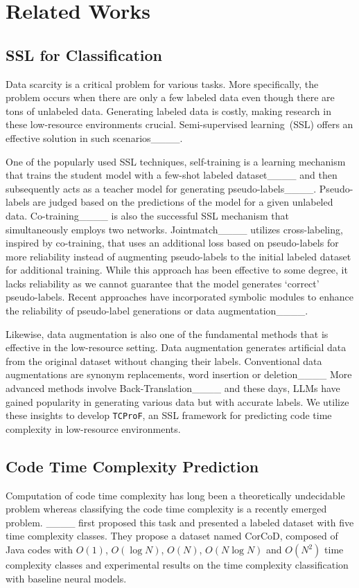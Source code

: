 \section{Related Works}
\subsection{SSL for Classification}
Data scarcity is a critical problem for various tasks.
More specifically, the problem occurs when there are only
a few labeled data even though there are tons of unlabeled data.
Generating labeled data is costly,
making research in these low-resource environments crucial.
Semi-supervised learning~(SSL) offers
an effective solution in such scenarios____.

One of the popularly used SSL techniques,
self-training is a learning mechanism that trains the student model with a few-shot labeled dataset____
and then subsequently acts as a teacher model for generating pseudo-labels____.
Pseudo-labels are judged based on the predictions of the model for a given unlabeled data.
Co-training____ is also the successful SSL mechanism
that simultaneously employs two networks.
Jointmatch____ utilizes cross-labeling, inspired by co-training, that uses an additional loss based on pseudo-labels for more reliability
instead of augmenting pseudo-labels to the initial labeled dataset for additional training.
While this approach has been effective to some degree,
it lacks reliability as we cannot guarantee that the model generates `correct' pseudo-labels.
Recent approaches have incorporated symbolic modules
to enhance the reliability of pseudo-label generations or data augmentation____.

Likewise, data augmentation is also one of the fundamental methods that
is effective in the low-resource setting.
Data augmentation generates artificial data from the original dataset
without changing their labels.
Conventional data augmentations are synonym replacements, word insertion or deletion____
More advanced methods involve Back-Translation____ and these days,
LLMs have gained popularity in generating various data but with accurate labels.
We utilize these insights to develop \texttt{TCProF},
an SSL framework for predicting code time complexity in low-resource environments.


\subsection{Code Time Complexity Prediction}
Computation of code time complexity has long been a theoretically undecidable problem
whereas classifying the code time complexity is a recently emerged problem.
____ first proposed this task and presented a labeled dataset with
five time complexity classes.
They propose a dataset named CorCoD,
composed of Java codes with $O(1)$, $O(\log N)$, $O(N)$, $O(N\log N)$ and $O(N^2)$ time complexity classes
and experimental results on the time complexity classification with baseline neural models.

